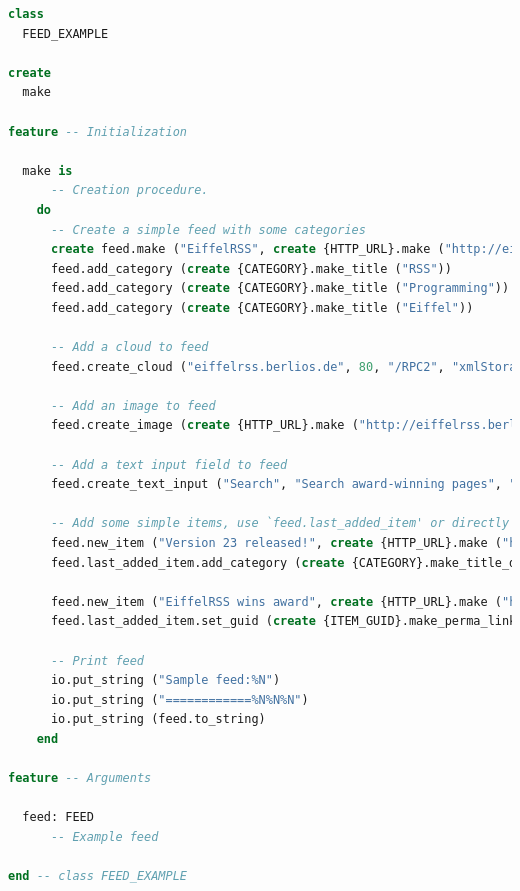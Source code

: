 \begin{lstlisting}[language=Eiffel]
class
  FEED_EXAMPLE

create
  make

feature -- Initialization

  make is
      -- Creation procedure.
    do
      -- Create a simple feed with some categories
      create feed.make ("EiffelRSS", create {HTTP_URL}.make ("http://eiffelrss.berlios.de"), "EiffelRSS news")
      feed.add_category (create {CATEGORY}.make_title ("RSS"))
      feed.add_category (create {CATEGORY}.make_title ("Programming"))
      feed.add_category (create {CATEGORY}.make_title ("Eiffel"))
      
      -- Add a cloud to feed
      feed.create_cloud ("eiffelrss.berlios.de", 80, "/RPC2", "xmlStorageSystem.rssPleaseNotify", "xml-rpc")
      
      -- Add an image to feed
      feed.create_image (create {HTTP_URL}.make ("http://eiffelrss.berlios.de/logo.png"), "EiffelRSS", create {HTTP_URL}.make ("http://eiffelrss.berlios.de"))
      
      -- Add a text input field to feed
      feed.create_text_input ("Search", "Search award-winning pages", "search", create {HTTP_URL}.make ("http://eiffelrss.berlios.de/Main/SearchWiki/"))
      
      -- Add some simple items, use `feed.last_added_item' or directly create an item for finer control
      feed.new_item ("Version 23 released!", create {HTTP_URL}.make ("http://eiffelrss.berlios.de/Main/News"), "Version 23 of EiffelRSS got release today. Happy syndicating!")
      feed.last_added_item.add_category (create {CATEGORY}.make_title_domain ("News", create {HTTP_URL}.make ("http://eiffelrss.berlios.de/Main/News/")))
      
      feed.new_item ("EiffelRSS wins award", create {HTTP_URL}.make ("http://eiffelrss.berlios.de/Main/Awards"), "EiffelRSS has been awarded by ISE as best syndication software written in Eiffel. For more info see award-winning pages: http://eiffelrss.berlios.de")
      feed.last_added_item.set_guid (create {ITEM_GUID}.make_perma_link ("http://eiffelrss.berlios.de/newsItem42"))
        
      -- Print feed
      io.put_string ("Sample feed:%N")
      io.put_string ("============%N%N%N")
      io.put_string (feed.to_string)
    end
    
feature -- Arguments

  feed: FEED
      -- Example feed

end -- class FEED_EXAMPLE
\end{lstlisting}



